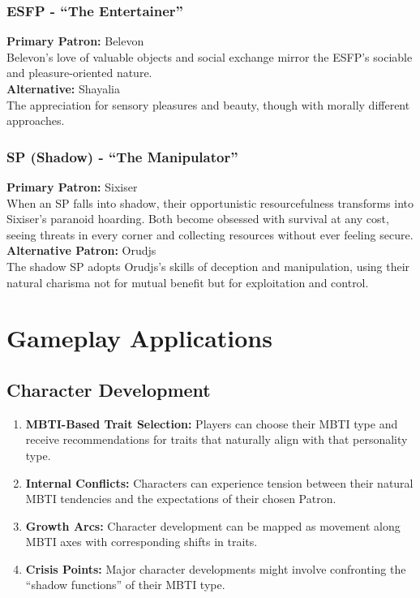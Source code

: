 \documentclass[a4paper,twoside,openany]{book}
\begin{document}
\begin{multicols}{2}
	\subsubsection*{ESFP - ``The Entertainer''}
	\textbf{Primary Patron:} Belevon\\
	Belevon's love of valuable objects and social exchange mirror the ESFP's sociable and pleasure-oriented nature.\\
	\textbf{Alternative:} Shayalia\\
	The appreciation for sensory pleasures and beauty, though with morally different approaches.

	\subsubsection*{SP (Shadow) - ``The Manipulator''}
	\textbf{Primary Patron:} Sixiser\\
	When an SP falls into shadow, their opportunistic resourcefulness transforms into Sixiser's paranoid hoarding. Both become obsessed with survival at any cost, seeing threats in every corner and collecting resources without ever feeling secure.\\
	\textbf{Alternative Patron:} Orudjs\\
	The shadow SP adopts Orudjs's skills of deception and manipulation, using their natural charisma not for mutual benefit but for exploitation and control.


	\section*{Gameplay Applications}


	\subsection*{Character Development}
	\begin{enumerate}
		\item \textbf{MBTI-Based Trait Selection:} Players can choose their MBTI type and receive recommendations for traits that naturally align with that personality type.
		\item \textbf{Internal Conflicts:} Characters can experience tension between their natural MBTI tendencies and the expectations of their chosen Patron.
		\item \textbf{Growth Arcs:} Character development can be mapped as movement along MBTI axes with corresponding shifts in traits.
		\item \textbf{Crisis Points:} Major character developments might involve confronting the ``shadow functions'' of their MBTI type.
	\end{enumerate}



\end{multicols}
\end{document}
